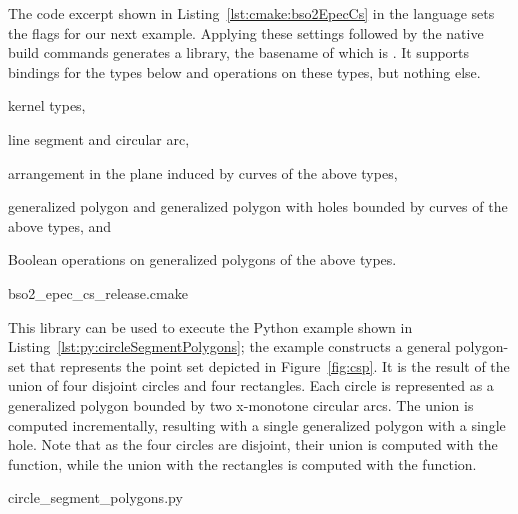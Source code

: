 The code excerpt shown in Listing~\ref{lst:cmake:bso2EpecCs} in the
\cmake{} language sets the \cmake{} flags for our next
example. Applying these settings followed by the native build commands
generates a library, the basename of which is
. It supports bindings
for the types below and operations on these types, but nothing else.
\begin{compactitem}
\item kernel types,
\item line segment and circular arc,
\item arrangement in the plane induced by curves of the above types,
\item generalized polygon and generalized polygon with holes bounded
  by curves of the above types, and
\item Boolean operations on generalized polygons of the above types.
\end{compactitem}

\begin{lstfloat}
  \def\filename{bso2_epec_cs_release.cmake}%
                  {\cmakeDir\filename}
\end{lstfloat}

This library can be used to execute the Python example shown in
Listing~\ref{lst:py:circleSegmentPolygons}; the example constructs a
general polygon-set that represents the point set depicted in
Figure~\ref{fig:csp}. It is the result of the union of four disjoint
circles and four rectangles. Each circle is represented as a
generalized polygon bounded by two x-monotone circular arcs. The union
is computed incrementally, resulting with a single generalized polygon
with a single hole. Note that as the four circles are disjoint, their
union is computed with the  function, while the
union with the rectangles is computed with the 
function.

\begin{lstfloat}
  \def\filename{circle_segment_polygons.py}%
                  {\pythonDir\filename}
\end{lstfloat}

